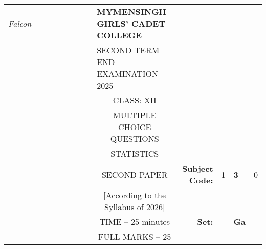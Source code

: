 \documentclass[12pt]{exam}
\begin{document}
\begin{table}[]
\begin{tabular}{llllllllcllll}
\textit{Falcon} &  &  &  &  &  &  &  & \multicolumn{1}{l}{\textbf{MYMENSINGH GIRLS' CADET COLLEGE}} &                                             &                        &                                 &                        \\
                &  &  &  &  &  &  &  & \multicolumn{1}{l}{SECOND TERM END EXAMINATION - 2025}       &                                             &                        & \multicolumn{1}{c}{}            &                        \\
                &  &  &  &  &  &  &  & CLASS: XII                                                   &                                             &                        & \multicolumn{1}{c}{}            &                        \\
                &  &  &  &  &  &  &  & MULTIPLE CHOICE QUESTIONS                                    &                                             &                        & \multicolumn{1}{c}{}            &                        \\
                &  &  &  &  &  &  &  & STATISTICS                                                   &                                             &                        & \multicolumn{1}{r}{}            &                        \\ \cline{11-13} 
                &  &  &  &  &  &  &  & SECOND PAPER                                                 & \multicolumn{1}{r|}{\textbf{Subject Code:}} & \multicolumn{1}{l|}{1} & \multicolumn{1}{l|}{\textbf{3}} & \multicolumn{1}{l|}{0} \\ \cline{11-13} 
                &  &  &  &  &  &  &  & [According to the Syllabus of 2026]                          & \multicolumn{1}{r}{}                        &                        &                                 &                        \\ \cline{12-12}
                &  &  &  &  &  &  &  & TIME – 25 minutes                                            & \multicolumn{1}{r}{\textbf{Set:}}           & \multicolumn{1}{l|}{}  & \multicolumn{1}{l|}{\textbf{Ga}} &                        \\ \cline{12-12}
                &  &  &  &  &  &  &  & FULL MARKS – 25                                              &                                             &                        &                                 &                       
\end{tabular}
\end{table}
\end{document}
